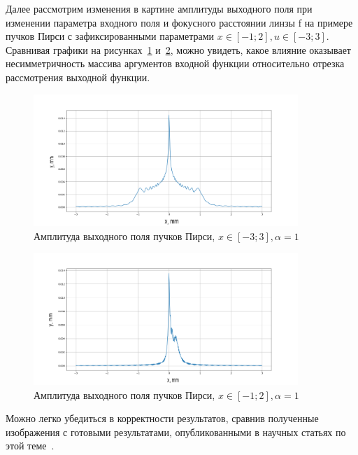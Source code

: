 {    Далее рассмотрим изменения в картине амплитуды выходного поля при
    изменении параметра входного поля и фокусного расстоянии линзы f на
    примере пучков Пирси с зафиксированными параметрами $x \in [-1; 2], u \in [-3; 3]$.
    Сравнивая графики на рисунках~\ref{pearceyoutput} и~\ref{pearceyoutput1}, можно увидеть, какое влияние
    оказывает несимметричность массива аргументов входной функции
    относительно отрезка рассмотрения выходной функции.

    \begin{figure}[H]
        \begin{center}
            \includegraphics[width=10cm]{plots/pearceyoutput}
            \caption{Амплитуда выходного поля пучков Пирси, $x \in [-3; 3], \alpha  = 1$}
            \label{pearceyoutput}
        \end{center}

    \end{figure}

    \begin{figure}[H]
        \begin{center}
            \includegraphics[width=10cm]{plots/pearceyoutput1}
            \caption{Амплитуда выходного поля пучков Пирси, $x \in [-1; 2], \alpha  = 1$}
            \label{pearceyoutput1}
        \end{center}

    \end{figure}


    Можно легко убедиться в корректности результатов, сравнив полученные
    изображения с готовыми результатами, опубликованными в научных статьях по
    этой теме~\cite{airy_acc}.

}

